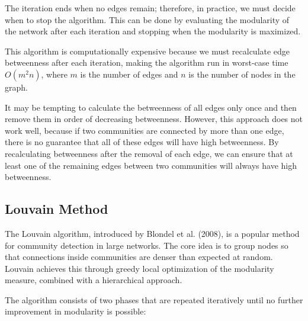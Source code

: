 The iteration ends when no edges remain; therefore, in practice, we must
decide when to stop the algorithm. This can be done by evaluating the modularity of
the network after each iteration and stopping when the modularity is maximized.

This algorithm is computationally expensive because we must
recalculate edge betweenness after each iteration, making the algorithm
run in worst-case time $O(m^2 n)$, where $m$ is the number of edges and $n$ is 
the number of nodes in the graph.

It may be tempting to calculate the betweenness of all edges only once and then remove them in order
of decreasing betweenness. However, this approach does not work well,
because if two communities are connected by more than one edge, there is 
no guarantee that all of these edges will have high betweenness. By
recalculating betweenness after the removal of each edge, we can ensure that 
at least one of the remaining edges between two communities will always have high betweenness.

\subsection{Louvain Method}

The Louvain algorithm, introduced by Blondel et al. (2008), is a popular method
for community detection in large networks. The core idea is to group nodes 
so that connections inside communities are denser than expected at random.
Louvain achieves this through greedy local optimization of the modularity measure, 
combined with a hierarchical approach.

The algorithm consists of two phases that are repeated iteratively until no
further improvement in modularity is possible:

